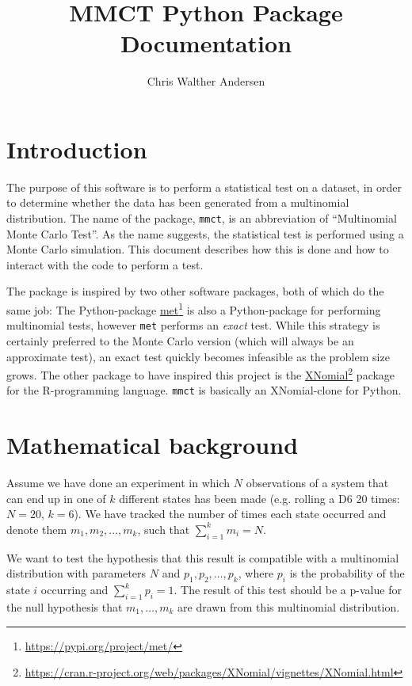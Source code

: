 \documentclass{ol-softwaremanual}
\title{MMCT Python Package \\ Documentation}
\author{Chris Walther Andersen}
\newcommand{\doclink}[2]{\href{#1}{#2}\footnote{\url{#1}}}
\newcommand{\mmct}{\texttt{mmct}}
\begin{document}
\maketitle

\tableofcontents
\listoflistings
\newpage

\section{Introduction}

The purpose of this software is to perform a statistical test on a dataset, in 
order to determine whether the data has been generated from a multinomial 
distribution. The name of the package, \mmct{}, is an abbreviation of 
\enquote{Multinomial Monte Carlo Test}. As the name suggests, the statistical 
test is performed using a Monte Carlo simulation. This document describes how 
this is done and how to interact with the code to perform a test.

The package is inspired by two other software packages, both of which do the 
same job:
The Python-package \doclink{https://pypi.org/project/met/}{met} is also a 
Python-package for performing multinomial tests, however \texttt{met} performs 
an \emph{exact} test. While this strategy is certainly preferred to the Monte 
Carlo version (which will always be an approximate test), an exact test quickly 
becomes infeasible as the problem size grows. The other package to have 
inspired this project is the 
\doclink{https://cran.r-project.org/web/packages/XNomial/vignettes/XNomial.html}{XNomial}
package for the R-programming language. \mmct{} is basically an XNomial-clone 
for 
Python.



\section{Mathematical background}

Assume we have done an experiment in which $N$ observations of a system that 
can end up in one of $k$ different states has been made (e.g. rolling a D6 20 
times: $N=20$, $k=6$). We have tracked the number of times each state occurred 
and denote them $m_1, m_2, \ldots, m_k$, such that $\sum_{i=1}^k m_i = N$.

We want to test the hypothesis that this result is compatible with a 
multinomial distribution with parameters $N$ and $p_1, p_2, \ldots, p_k$, where 
$p_i$ is the probability of the state $i$ occurring and $\sum_{i=1}^k p_i = 
1$. The result of this test should be a p-value for the null hypothesis that 
$m_1, \ldots, m_k$ are drawn from this multinomial distribution.
\end{document}
